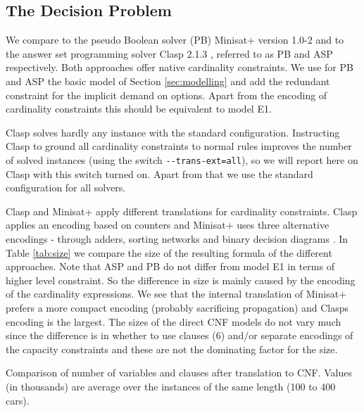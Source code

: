 \documentclass[]{llncs}
\begin{document}
\subsection{The Decision Problem}

We compare to the pseudo Boolean solver (PB) Minisat+ version 1.0-2 \cite{Een06} and to the answer set programming
solver Clasp 2.1.3 \cite{Gebser07}, referred to as PB and ASP respectively. Both approaches offer native cardinality
constraints. We use for PB and ASP the basic model of Section \ref{sec:modelling} and add the redundant constraint for
the implicit demand on options. Apart from the encoding of cardinality constraints this should be equivalent to model
E1. 
      
Clasp solves hardly any instance with the standard configuration. Instructing Clasp to ground all cardinality
constraints to normal rules improves the number of solved instances (using the switch \verb+--trans-ext=all+), so we
will report here on Clasp with this switch turned on. Apart from that we use the standard configuration for all solvers. 

Clasp and Minisat+ apply different translations for cardinality constraints. Clasp applies an encoding based on counters
\cite{Gebser09} and Minisat+ uses three alternative encodings - through adders, sorting networks and binary decision
diagrams \cite{Een06}. In Table \ref{tab:size} we compare the size of the resulting formula of the different approaches.
Note that ASP and PB do not differ from model E1 in terms of higher level constraint. So the difference in size is
mainly caused by the encoding of the cardinality expressions. We see that the internal translation of Minisat+ prefers a
more compact encoding (probably sacrificing propagation) and Clasps encoding is the largest. The sizes of the direct CNF
models do not vary much since the difference is in whether to use clauses (6) and/or separate encodings of the capacity
constraints and these are not the dominating factor for the size. 

\begin{table}[htbp] 
    \caption{Comparison of number of variables and clauses after translation to CNF. Values (in thousands) are average
    over the instances of the same length (100 to 400 cars).} 
    \centering
    
    \label{tab:size}
\end{table}
\end{document}
